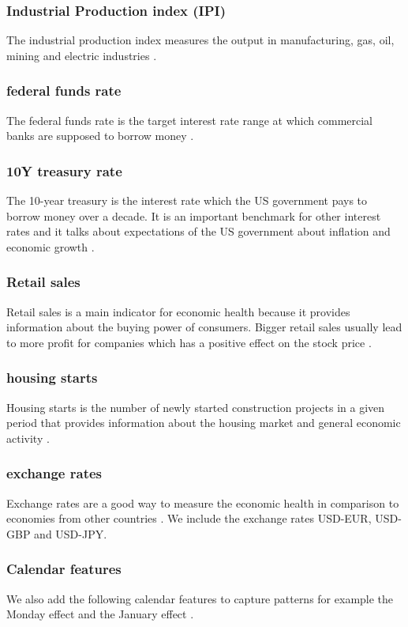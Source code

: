 \documentclass[a4paper,12pt]{report}
\begin{document}
			\subsubsection{Industrial Production index (IPI)}
			The industrial production index measures the output in manufacturing, gas, oil, mining and electric industries \cite{42}.
			\subsubsection{federal funds rate}
			The federal funds rate is the target interest rate range at which commercial banks are supposed to borrow money \cite{43}.
			\subsubsection{10Y treasury rate}
			The 10-year treasury is the interest rate which the US government pays to borrow money over a decade. It is an important benchmark for other interest rates and it talks about expectations of the US government about inflation and economic growth \cite{44}.
			\subsubsection{Retail sales}
			Retail sales is a main indicator for economic health because it provides information about the buying power of consumers. Bigger retail sales usually lead to more profit for companies which has a positive effect on the stock price \cite{40}. 
			\subsubsection{housing starts}
			Housing starts is the number of newly started construction projects in a given period that provides information about the housing market and general economic activity \cite{45}. 
			\subsubsection{exchange rates}
Exchange rates are a good way to measure the economic health in comparison to economies from other countries \cite{46} \cite{47}. We include the exchange rates USD-EUR, USD-GBP and USD-JPY.
			\subsubsection{Calendar features}
We also add the following calendar features to capture patterns for example the Monday effect \cite{28} and the January effect \cite{29}.
\end{document}
